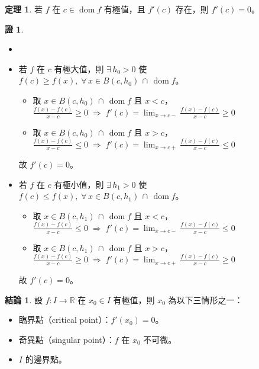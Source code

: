 \documentclass[12pt]{extarticle}
\newcommand{\ds}{\displaystyle}
\newcommand{\ie}{\;\Longrightarrow\;}
\DeclareMathOperator*{\dom}{dom}
\theoremstyle{definition}
\newtheorem*{fact}{結論}
\newtheorem*{thm}{定理}
\newtheorem*{prf}{證}
\begin{document}
\begin{thm}
  若 $f$ 在 $c\in\dom f$ 有極值，且 $f'(c)$ 存在，則 $f'(c) = 0$。
\end{thm}

\begin{prf}
  \begin{itemize}\setlength\itemsep{0em}
    \item[]
    \item 若 $f$ 在 $c$ 有極大值，則 $\ds\exists\,h_0 > 0$ 使 $\ds f(c)\geqslant f(x),\;\forall\,x\in B(c, h_0)\,\cap\,\dom{f}$。
      \begin{itemize}\setlength\itemsep{0em}
      \item 取 $\ds x \in B(c, h_0)\,\cap\,\dom{f}$ 且 $x < c$，$\ds\frac{f(x) - f(c)}{x - c} \geqslant 0 \ie f'(c) = \lim_{x\to c-}\frac{f(x) - f(c)}{x - c}\geqslant 0$
      \item 取 $\ds x \in B(c, h_0)\,\cap\,\dom{f}$ 且 $x > c$，$\ds\frac{f(x) - f(c)}{x - c} \leqslant 0 \ie f'(c) = \lim_{x\to c+}\frac{f(x) - f(c)}{x - c}\leqslant 0$
    \end{itemize}
    故 $f'(c) = 0$。
  \item 若 $f$ 在 $c$ 有極小值，則 $\ds\exists\,h_1 > 0$ 使 $\ds f(c)\leqslant f(x),\;\forall\,x\in B(c, h_1)\,\cap\,\dom{f}$。
    \begin{itemize}\setlength\itemsep{0em}
      \item 取 $\ds x \in B(c, h_1)\,\cap\,\dom{f}$ 且 $x < c$，$\ds\frac{f(x) - f(c)}{x - c} \leqslant 0 \ie f'(c) = \lim_{x\to c-}\frac{f(x) - f(c)}{x - c}\leqslant 0$
      \item 取 $\ds x \in B(c, h_1)\,\cap\,\dom{f}$ 且 $x > c$，$\ds\frac{f(x) - f(c)}{x - c} \geqslant 0 \ie f'(c) = \lim_{x\to c+}\frac{f(x) - f(c)}{x - c}\geqslant 0$
    \end{itemize}
    故 $f'(c) = 0$。
  \end{itemize}
\end{prf}

\begin{fact}
  設 $f:I\to\mathbb{R}$ 在 $x_0\in I$ 有極值，則 $x_0$ 為以下三情形之一：
  \begin{itemize}\setlength\itemsep{0em}
    \item 臨界點（critical point）：$\ds f'(x_0) = 0$。
    \item 奇異點（singular point）：$f$ 在 $x_0$ 不可微。 
    \item $I$ 的邊界點。
  \end{itemize}
\end{fact}
\end{document}
